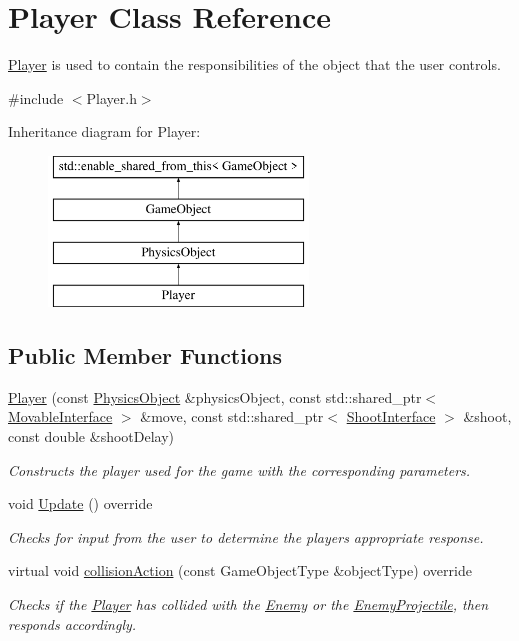 \hypertarget{class_player}{}\section{Player Class Reference}
\label{class_player}


\hyperlink{class_player}{Player} is used to contain the responsibilities of the object that the user controls.  




{\ttfamily \#include $<$Player.\+h$>$}

Inheritance diagram for Player\+:\begin{figure}[H]
\begin{center}
\leavevmode
\includegraphics[height=4.000000cm]{d8/d53/class_player}
\end{center}
\end{figure}
\subsection*{Public Member Functions}
\begin{DoxyCompactItemize}
\item 
\hyperlink{class_player_a65468a4fb563e8df6f2d1ae4fc341bc9}{Player} (const \hyperlink{class_physics_object}{Physics\+Object} \&physics\+Object, const std\+::shared\+\_\+ptr$<$ \hyperlink{class_movable_interface}{Movable\+Interface} $>$ \&move, const std\+::shared\+\_\+ptr$<$ \hyperlink{class_shoot_interface}{Shoot\+Interface} $>$ \&shoot, const double \&shoot\+Delay)
\begin{DoxyCompactList}\small\item\em Constructs the player used for the game with the corresponding parameters. \end{DoxyCompactList}\item 
\mbox{\label{class_player_a5e17be3418fa0ac0192c05efaf3dc8bd}} 
void \hyperlink{class_player_a5e17be3418fa0ac0192c05efaf3dc8bd}{Update} () override
\begin{DoxyCompactList}\small\item\em Checks for input from the user to determine the players appropriate response. \end{DoxyCompactList}\item 
virtual void \hyperlink{class_player_a1089079d7149a7fce6226935a6ce2f9c}{collision\+Action} (const Game\+Object\+Type \&object\+Type) override
\begin{DoxyCompactList}\small\item\em Checks if the \hyperlink{class_player}{Player} has collided with the \hyperlink{class_enemy}{Enemy} or the \hyperlink{class_enemy_projectile}{Enemy\+Projectile}, then responds accordingly. \end{DoxyCompactList}\end{DoxyCompactItemize}
